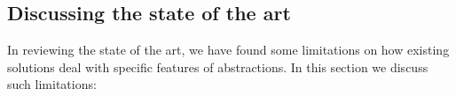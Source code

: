 
%
%
%
%


\subsection{Discussing the state of the art}

In reviewing the state of the art, we have found some limitations on how existing solutions deal with specific features of abstractions.
In this section we discuss such limitations:


